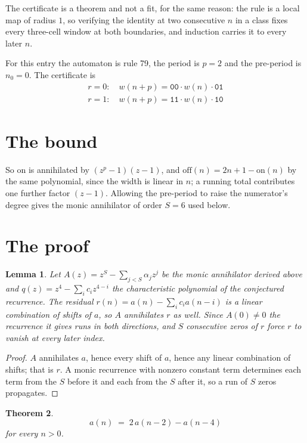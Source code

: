 \documentclass[11pt,a4paper]{article}
\theoremstyle{plain}
\newtheorem{theorem}{Theorem}
\newtheorem{lemma}[theorem]{Lemma}
\theoremstyle{definition}
\begin{document}
The certificate is a theorem and not a fit, for the same reason: the rule is a local map of
radius $1$, so verifying the identity at two consecutive $n$ in a class fixes every three-cell
window at both boundaries, and induction carries it to every later $n$.

For this entry the automaton is rule 79, the period is $p=2$ and the pre-period is $n_0=0$.
The certificate is
\begin{gather*}
r=0:\quad w(n+p) = \texttt{00} \cdot w(n) \cdot \texttt{01} \\
r=1:\quad w(n+p) = \texttt{11} \cdot w(n) \cdot \texttt{10}
\end{gather*}

\section{The bound}

So
$\mathrm{on}$ is annihilated by $(z^p-1)(z-1)$, and $\mathrm{off}(n)=2n+1-\mathrm{on}(n)$ by
the same polynomial, since the width is linear in $n$; a running total contributes one further
factor $(z-1)$. Allowing the pre-period to raise the numerator's degree gives the monic
annihilator of order $S=6$ used below.

\section{The proof}

\begin{lemma}\label{lem:crit}
Let $A(z)=z^S-\sum_{j<S}\alpha_jz^{j}$ be the monic annihilator derived above and
$q(z)=z^{4}-\sum_ic_iz^{4-i}$ the characteristic polynomial of the conjectured
recurrence. The residual $r(n)=a(n)-\sum_ic_ia(n-i)$ is a linear combination of shifts of $a$,
so $A$ annihilates $r$ as well. Since $A(0)\ne0$ the recurrence it gives runs in both
directions, and $S$ consecutive zeros of $r$ force $r$ to vanish at every later index.
\end{lemma}

\begin{proof}
$A$ annihilates $a$, hence every shift of $a$, hence any linear combination of shifts; that is
$r$. A monic recurrence with nonzero constant term determines each term from the $S$ before it
and each from the $S$ after it, so a run of $S$ zeros propagates.
\end{proof}

\begin{theorem}
\[
a(n)\;=\;2\,a(n-2) - a(n-4)
\]
for every $n>0$.
\end{theorem}
\end{document}
